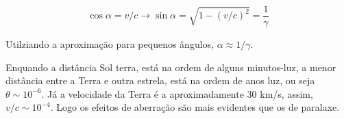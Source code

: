 \documentclass[11pt]{article}
\begin{document}
\begin{pproblem}
\begin{pssolution*}{}{}
\begin{alternativas}
            \[\cos\alpha = v/c \rightarrow \sin\alpha = \sqrt{1-(v/c)^2} = \frac{1}{\gamma}\]

            Utilziando a aproximação para pequenos ângulos, \(\boxed{\alpha \approx 1/\gamma}\).

            \item Enquando a distância Sol terra, está na ordem de alguns minutos-luz, a menor distância entre a Terra e outra estrela, está na ordem de anos luz, ou seja \(\theta \sim 10^{-6}\). Já a velocidade da Terra é a aproximadamente \(30\) km/s, assim, \(v/c \sim 10^{-4}\). Logo os efeitos de aberração são mais evidentes que os de paralaxe.


        \end{alternativas}

        \end{pssolution*}

\end{pproblem}
\end{document}

